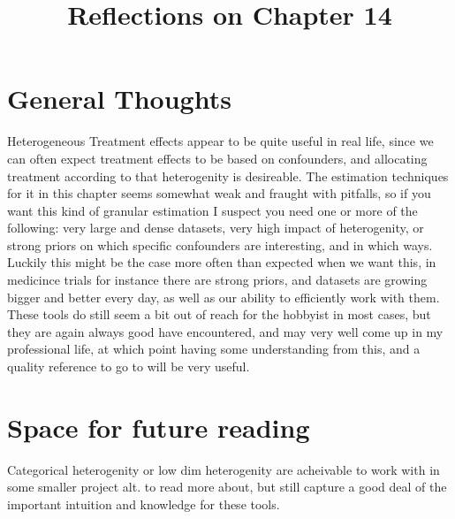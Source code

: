 \documentclass[10pt, english]{article}
\begin{document}
\title{Reflections on Chapter 14}
\date{}
\author{}

\maketitle


\section*{General Thoughts}
Heterogeneous Treatment effects appear to be quite useful in real life, since we can often expect treatment effects to be based on confounders, and allocating treatment according to that heterogenity is desireable. The estimation techniques
for it in this chapter seems somewhat weak and fraught with pitfalls, so if you want this kind of granular estimation I suspect you need one or more of the following: very large and dense datasets, very high impact of heterogenity, or strong 
priors on which specific confounders are interesting, and in which ways. Luckily this might be the case more often than expected when we want this, in medicince trials for instance there are strong priors, and datasets are growing bigger
and better every day, as well as our ability to efficiently work with them. These tools do still seem a bit out of reach for the hobbyist in most cases, but they are again always good have encountered, and may very well come up in my professional
life, at which point having some understanding from this, and a quality reference to go to will be very useful.

\section*{Space for future reading}
Categorical heterogenity or low dim heterogenity are acheivable to work with in some smaller project alt. to read more about, but still capture a good deal of the important intuition and knowledge for these tools.
\end{document}

